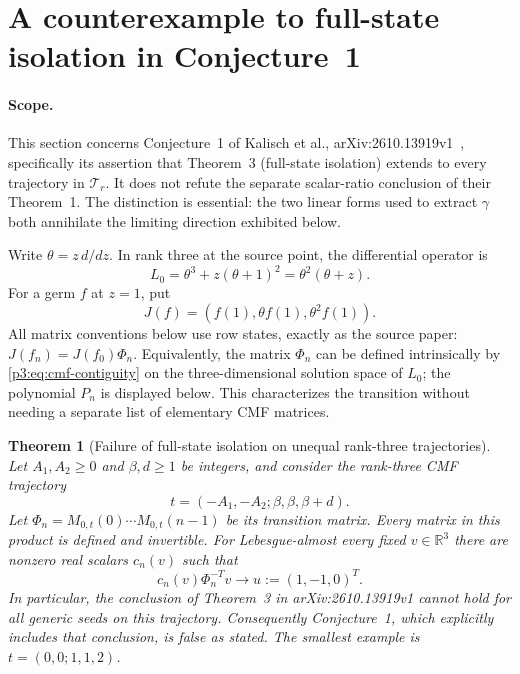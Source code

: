 \documentclass[11pt,a4paper]{article}
\newtheorem{theorem}{Theorem}[section]
\theoremstyle{definition}
\theoremstyle{remark}
\numberwithin{equation}{section}
\begin{document}
\section{A counterexample to full-state isolation in Conjecture~1}
\label{p3:sec:cmf-counterexample}

\paragraph{Scope.}
This section concerns Conjecture~1 of Kalisch et al.,
arXiv:2610.13919v1~\cite{p3:KMLWSK26}, specifically its assertion that Theorem~3 (full-state
isolation) extends to every trajectory in $\mathcal T_r$.
It does not refute the separate scalar-ratio conclusion of their Theorem~1.
The distinction is essential: the two linear forms used to extract $\gamma$
both annihilate the limiting direction exhibited below.

Write $\theta=z\,d/dz$. In rank three at the source point, the differential
operator is
\[
 L_0=\theta^3+z(\theta+1)^2=\theta^2(\theta+z).
\]
For a germ $f$ at $z=1$, put
\[
 J(f)=(f(1),\theta f(1),\theta^2f(1)).
\]
All matrix conventions below use row states, exactly as the source paper:
$J(f_n)=J(f_0)\Phi_n$.
Equivalently, the matrix $\Phi_n$ can be defined intrinsically by
\eqref{p3:eq:cmf-contiguity} on the three-dimensional solution space of $L_0$;
the polynomial $P_n$ is displayed below. This characterizes the transition
without needing a separate list of elementary CMF matrices.

\begin{theorem}[Failure of full-state isolation on unequal rank-three trajectories]
\label{p3:thm:full-state-counterexample}
Let $A_1,A_2\geq0$ and $\beta,d\geq1$ be integers, and consider the rank-three
CMF trajectory
\[
 t=(-A_1,-A_2;\beta,\beta,\beta+d).
\]
Let $\Phi_n=M_{0,t}(0)\cdots M_{0,t}(n-1)$ be its transition matrix.
Every matrix in this product is defined and invertible.
For Lebesgue-almost every fixed $v\in\mathbb R^3$ there are nonzero real
scalars $c_n(v)$ such that
\[
 c_n(v)\Phi_n^{-T}v\longrightarrow u:=(1,-1,0)^T.
\]
In particular, the conclusion of Theorem~3 in arXiv:2610.13919v1 cannot
hold for all generic seeds on this trajectory. Consequently Conjecture~1,
which explicitly includes that conclusion, is false as stated.
The smallest example is $t=(0,0;1,1,2)$.
\end{theorem}
\end{document}
